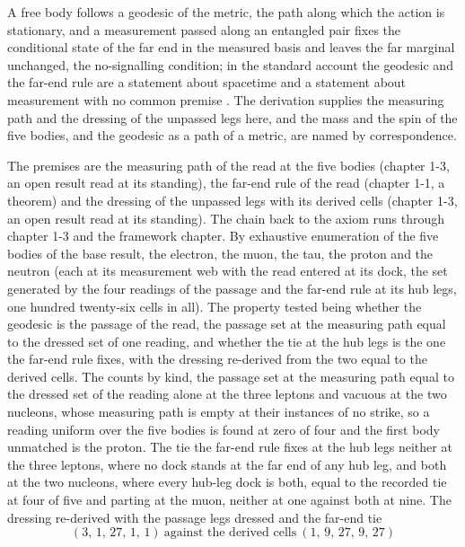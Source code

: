 \begin{chbridge}
A free body follows a geodesic of the metric, the path along which the action is stationary, and a measurement passed along an entangled pair fixes the conditional state of the far end in the measured basis and leaves the far marginal unchanged, the no-signalling condition; in the standard account the geodesic and the far-end rule are a statement about spacetime and a statement about measurement with no common premise \cite{Einstein1916,EPR1935,Schrodinger1935}. The derivation supplies the measuring path and the dressing of the unpassed legs here, and the mass and the spin of the five bodies, and the geodesic as a path of a metric, are named by correspondence.
\end{chbridge}
\begin{chproof}[census]
The premises are the measuring path of the read at the five bodies (chapter 1-3, an open result read at its standing), the far-end rule of the read (chapter 1-1, a theorem) and the dressing of the unpassed legs with its derived cells (chapter 1-3, an open result read at its standing). The chain back to the axiom runs through chapter 1-3 and the framework chapter. By exhaustive enumeration of the five bodies of the base result, the electron, the muon, the tau, the proton and the neutron (each at its measurement web with the read entered at its dock, the set generated by the four readings of the passage and the far-end rule at its hub legs, one hundred twenty-six cells in all). The property tested being whether the geodesic is the passage of the read, the passage set at the measuring path equal to the dressed set of one reading, and whether the tie at the hub legs is the one the far-end rule fixes, with the dressing re-derived from the two equal to the derived cells. The counts by kind, the passage set at the measuring path equal to the dressed set of the reading alone at the three leptons and vacuous at the two nucleons, whose measuring path is empty at their instances of no strike, so a reading uniform over the five bodies is found at zero of four and the first body unmatched is the proton. The tie the far-end rule fixes at the hub legs neither at the three leptons, where no dock stands at the far end of any hub leg, and both at the two nucleons, where every hub-leg dock is both, equal to the recorded tie at four of five and parting at the muon, neither at one against both at nine. The dressing re-derived with the passage legs dressed and the far-end tie
\begin{equation}
(3,\,1,\,27,\,1,\,1)\ \text{against the derived cells}\ (1,\,9,\,27,\,9,\,27)

\end{equation}
\end{chproof}
